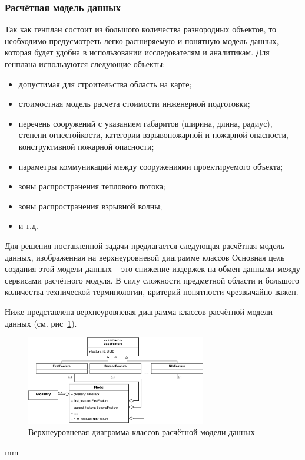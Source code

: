 \subsubsection{\large{Расчётная модель данных}}

Так как генплан состоит из большого количества разнородных объектов,
то необходимо предусмотреть легко расширяемую и понятную модель данных,
которая будет удобна в использовании исследователям и аналитикам.
Для генплана используются следующие объекты:
\begin{itemize}
    \item допустимая для строительства область на карте;
    \item стоимостная модель расчета стоимости инженерной подготовки;
    \item перечень сооружений с указанием габаритов (ширина, длина, радиус),
    степени огнестойкости, категории взрывопожарной и пожарной опасности, конструктивной пожарной опасности;
    \item параметры коммуникаций между сооружениями проектируемого объекта;
    \item зоны распространения теплового потока;
    \item зоны распространения взрывной волны;
	\item и т.д.
\end{itemize}

Для решения поставленной задачи предлагается следующая расчётная модель данных, изображенная
на верхнеуровневой диаграмме классов
Основная цель создания этой модели данных -- это снижение издержек на обмен данными между
сервисами расчётного модуля.
В силу сложности предметной области и большого количества технической терминологии,
критерий понятности чрезвычайно важен.

Ниже представлена верхнеуровневая диаграмма классов расчётной модели данных
(см. рис\ \ref{pic:architecture__model-classes}).

\begin{figure}[H]
	\hspace*{-2.5 cm}\includegraphics[width=0.7\textwidth, left]{architecture/pictures/model/classes}
	\caption{Верхнеуровневая диаграмма классов расчётной модели данных}
	\label{pic:architecture__model-classes}
\end{figure}
 mm

